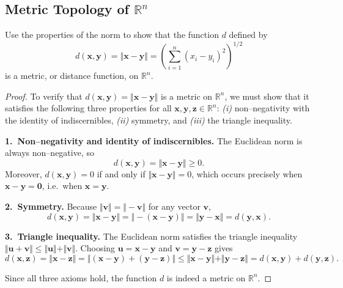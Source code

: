 \documentclass[10pt]{extarticle}
\begin{document}
\subsection{Metric Topology of $\mathbb{R}^n$}

\begin{exercise}[4.1]
    Use the properties of the norm to show that the function $d$ defined by
    $$
        d(\mathbf{x}, \mathbf{y}) = \Vert \mathbf{x} - \mathbf{y} \Vert = \left(\sum_{i=1}^{n}(x_i - y_i)^2\right)^{1/2}
    $$
    is a metric, or distance function, on $\mathbb{R}^n$.
\end{exercise}

\begin{proof}
    To verify that $d(\mathbf{x}, \mathbf{y}) = \Vert \mathbf{x} - \mathbf{y} \Vert$ is a metric on $\mathbb{R}^n$, we must show that it satisfies the following three properties for all $\mathbf{x}, \mathbf{y}, \mathbf{z} \in \mathbb{R}^n$:
    \emph{(i)} non--negativity with the identity of indiscernibles, \emph{(ii)} symmetry, and \emph{(iii)} the triangle inequality.

    \medskip
    \textbf{1.~Non--negativity and identity of indiscernibles.} The Euclidean norm is always non--negative, so
    $$
        d(\mathbf{x}, \mathbf{y}) = \Vert \mathbf{x} - \mathbf{y} \Vert \ge 0.
    $$
    Moreover, $d(\mathbf{x}, \mathbf{y}) = 0$ if and only if $\Vert \mathbf{x} - \mathbf{y} \Vert = 0$, which occurs precisely when $\mathbf{x} - \mathbf{y} = \mathbf{0}$, i.e.~when $\mathbf{x} = \mathbf{y}$.

    \medskip
    \textbf{2.~Symmetry.} Because $\Vert \mathbf{v} \Vert = \Vert -\mathbf{v} \Vert$ for any vector $\mathbf{v}$,
    $$
        d(\mathbf{x}, \mathbf{y}) = \Vert \mathbf{x} - \mathbf{y} \Vert = \Vert -(\mathbf{x} - \mathbf{y}) \Vert = \Vert \mathbf{y} - \mathbf{x} \Vert = d(\mathbf{y}, \mathbf{x}).
    $$

    \medskip
    \textbf{3.~Triangle inequality.} The Euclidean norm satisfies the triangle inequality $\Vert \mathbf{u} + \mathbf{v} \Vert \le \Vert \mathbf{u} \Vert + \Vert \mathbf{v} \Vert$. Choosing $\mathbf{u} = \mathbf{x} - \mathbf{y}$ and $\mathbf{v} = \mathbf{y} - \mathbf{z}$ gives
    $$
        d(\mathbf{x}, \mathbf{z}) = \Vert \mathbf{x} - \mathbf{z} \Vert = \Vert (\mathbf{x} - \mathbf{y}) + (\mathbf{y} - \mathbf{z}) \Vert \le \Vert \mathbf{x} - \mathbf{y} \Vert + \Vert \mathbf{y} - \mathbf{z} \Vert = d(\mathbf{x}, \mathbf{y}) + d(\mathbf{y}, \mathbf{z}).
    $$

    Since all three axioms hold, the function $d$ is indeed a metric on $\mathbb{R}^n$.
\end{proof}
\end{document}

